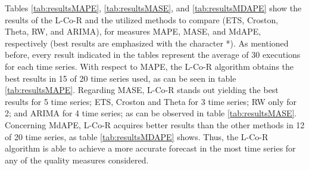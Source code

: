 \documentclass[a4paper,twoside]{article}
\newcommand{\metodo}{L-Co-R}
\begin{document}

Tables \ref{tab:resultsMAPE}, \ref{tab:resultsMASE}, and \ref{tab:resultsMDAPE} show the results of the {\metodo} and the utilized methods to compare (ETS, Croston, Theta, RW, and ARIMA), for measures MAPE, MASE, and MdAPE, respectively (best results are emphasized with the character *). As mentioned before, every result indicated in the tables represent the average of 30 executions for each time series. With respect to MAPE, the {\metodo} algorithm obtains the best results in 15 of 20 time series used, as can be seen in table \ref{tab:resultsMAPE}. Regarding MASE, {\metodo} stands out yielding the best results for 5 time series; ETS, Croston and Theta for 3 time series; RW only for 2; and ARIMA for 4 time series; as can be observed in table \ref{tab:resultsMASE}. Concerning MdAPE, {\metodo} acquires better results than the other methods in 12 of 20 time series, as table \ref{tab:resultsMDAPE} shows. Thus, the {\metodo} algorithm is able to achieve a more accurate forecast in the most time series for any of the quality measures considered.
\end{document}
